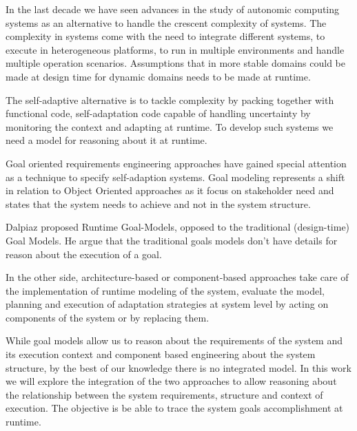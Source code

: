 In the last decade we have seen advances in the study of autonomic computing systems as an alternative to handle the crescent complexity of systems. The complexity in systems come with the need to integrate different systems, to execute in heterogeneous platforms, to run in multiple environments and handle multiple operation scenarios.
Assumptions that in more stable domains could be made at design time for dynamic domains needs to be made at runtime.

The self-adaptive alternative is to tackle complexity by packing together with functional code, self-adaptation code capable of handling uncertainty by monitoring the context and adapting at runtime. To develop such systems we need a model for reasoning about it at runtime.








Goal oriented requirements engineering approaches have gained special attention as a technique to specify self-adaption systems. Goal modeling represents a shift in relation to Object Oriented approaches as it focus on stakeholder need and states that the system needs to achieve and not in the system structure. \cite{ali_goal-based_2010}

Dalpiaz proposed Runtime Goal-Models, opposed to the traditional (design-time) Goal Models. He argue that the traditional goals models don't have details for reason about the execution of a goal. \cite{dalpiaz_runtime_2013} %

In the other side, architecture-based or component-based approaches take care of the implementation of runtime modeling of the system, evaluate the model, planning and execution of adaptation strategies at system level by acting on components of the system or by replacing them. \cite{garlan_software_2009}


 While goal models allow us to reason about the requirements of the system and its execution context and component based engineering about the system structure, by the best of our knowledge there is no integrated model.
 In this work we will explore the integration of the two approaches to allow reasoning about the relationship between the system requirements, structure and context of execution. The objective is be able to trace the system goals accomplishment at runtime.
